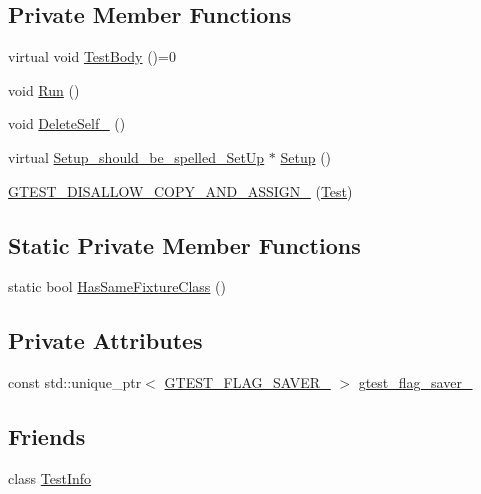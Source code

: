 \subsection*{Private Member Functions}
\begin{DoxyCompactItemize}
\item 
virtual void \hyperlink{classtesting_1_1Test_a146a4a5d9854e676d625a0ef67409794}{Test\+Body} ()=0
\item 
void \hyperlink{classtesting_1_1Test_a939ae280a6f2f1c3d43708ec616684ed}{Run} ()
\item 
void \hyperlink{classtesting_1_1Test_a3116f1f98ac889b11f1e3d981b8c6ca1}{Delete\+Self\+\_\+} ()
\item 
virtual \hyperlink{structtesting_1_1Test_1_1Setup__should__be__spelled__SetUp}{Setup\+\_\+should\+\_\+be\+\_\+spelled\+\_\+\+Set\+Up} $\ast$ \hyperlink{classtesting_1_1Test_a65c1626d50b7dd1a1d759dc6c3f72d4c}{Setup} ()
\item 
\hyperlink{classtesting_1_1Test_a5d18da7437b0d6ca32dcad90a21f9b6b}{G\+T\+E\+S\+T\+\_\+\+D\+I\+S\+A\+L\+L\+O\+W\+\_\+\+C\+O\+P\+Y\+\_\+\+A\+N\+D\+\_\+\+A\+S\+S\+I\+G\+N\+\_\+} (\hyperlink{classtesting_1_1Test}{Test})
\end{DoxyCompactItemize}
\subsection*{Static Private Member Functions}
\begin{DoxyCompactItemize}
\item 
static bool \hyperlink{classtesting_1_1Test_a2d621c1300d3e850bcf1de70b57eb488}{Has\+Same\+Fixture\+Class} ()
\end{DoxyCompactItemize}
\subsection*{Private Attributes}
\begin{DoxyCompactItemize}
\item 
const std\+::unique\+\_\+ptr$<$ \hyperlink{gtest-port_8h_a3749ef4fba6b3c3993609b336031644d}{G\+T\+E\+S\+T\+\_\+\+F\+L\+A\+G\+\_\+\+S\+A\+V\+E\+R\+\_\+} $>$ \hyperlink{classtesting_1_1Test_a7801584e65ac93e641916baa14f03943}{gtest\+\_\+flag\+\_\+saver\+\_\+}
\end{DoxyCompactItemize}
\subsection*{Friends}
\begin{DoxyCompactItemize}
\item 
class \hyperlink{classtesting_1_1Test_a4c49c2cdb6c328e6b709b4542f23de3c}{Test\+Info}
\end{DoxyCompactItemize}


